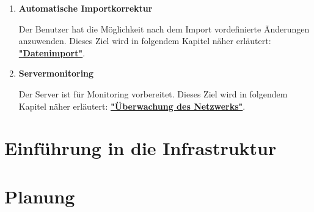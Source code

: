 \documentclass[
    headings=optiontotocandhead,%
    twoside,
    numbers=noenddot,%
    toc=flat, %
    12pt, %
    titlepage, %
    parskip=full, %
    listof=totoc, %
    listof=flat, %
    numbers=noenddot, %
    bibliography=totoc, %
    a4paper,DIV=14,
    BCOR=15mm,
]{scrbook}
\begin{document}
\begin{enumerate}
  \item \textbf{Automatische Importkorrektur}

  Der Benutzer hat die Möglichkeit nach dem Import vordefinierte Änderungen anzuwenden.
  Dieses Ziel wird in folgendem Kapitel näher erläutert: \textbf{\href{datenimport}{"Datenimport"}}.




  \item \textbf{Servermonitoring}

  Der Server ist für Monitoring vorbereitet.
  Dieses Ziel wird in folgendem Kapitel näher erläutert: \textbf{\href{überwachung-des-netzwerks}{"Überwachung des Netzwerks"}}.
\end{enumerate}



%

\renewcommand{\kapitelautor}{Autor: Josip Domazet}



\renewcommand{\kapitelautor}{Autor: Mathias Möller}



\chapter{Einführung in die Infrastruktur}
\renewcommand{\kapitelautor}{Autor: Hannes Weiss}




\renewcommand{\kapitelautor}{}

\chapter{Planung}


% 
\end{document}
